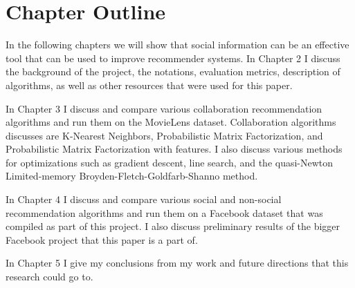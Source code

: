 \section{Chapter Outline}

In the following chapters we will show that social information can be an effective tool that can be used to improve recommender systems. In Chapter 2 I  discuss the background of the project, the notations, evaluation metrics, description of algorithms, as well as other resources that were used for this paper.

In Chapter 3 I discuss and compare various collaboration recommendation algorithms and run them on the MovieLens dataset. Collaboration algorithms discusses are K-Nearest Neighbors, Probabilistic Matrix Factorization, and Probabilistic Matrix Factorization with features. I also discuss various methods for optimizations such as gradient descent, line search, and the quasi-Newton Limited-memory Broyden-Fletch-Goldfarb-Shanno method.

In Chapter 4  I discuss and compare various social and non-social recommendation algorithms and run them on a Facebook dataset that was compiled as part of this project. I also discuss preliminary results of the bigger Facebook project that this paper is a part of.

In Chapter 5 I give my conclusions from my work and future directions that this research could go to.


